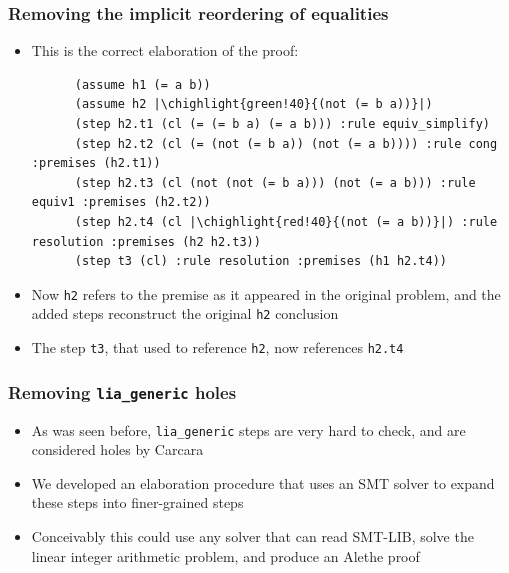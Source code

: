 \documentclass[usepdftitle=false,aspectratio=169]{beamer}
\newcommand\vitem{\vfill\item}
\newcommand\chighlight[2]{\setlength{\fboxsep}{0pt}\colorbox{#1}{#2\strut}}
\begin{document}
\begin{frame}[fragile]
  \frametitle{Removing the implicit reordering of equalities}
  \begin{itemize}
    \begin{verbatim}
      (assume h1 (= a b))
      (assume h2 |\chighlight{red!40}{(not (= a b))}|)
      (step t3 (cl) :rule resolution :premises (h1 h2))
    \end{verbatim}
    \vitem This is the correct elaboration of the proof:
    \begin{verbatim}
      (assume h1 (= a b))
      (assume h2 |\chighlight{green!40}{(not (= b a))}|)
      (step h2.t1 (cl (= (= b a) (= a b))) :rule equiv_simplify)
      (step h2.t2 (cl (= (not (= b a)) (not (= a b)))) :rule cong :premises (h2.t1))
      (step h2.t3 (cl (not (not (= b a))) (not (= a b))) :rule equiv1 :premises (h2.t2))
      (step h2.t4 (cl |\chighlight{red!40}{(not (= a b))}|) :rule resolution :premises (h2 h2.t3))
      (step t3 (cl) :rule resolution :premises (h1 h2.t4))
    \end{verbatim}
    \vitem Now \texttt{h2} refers to the premise as it appeared in the original
    problem, and the added steps reconstruct the original \texttt{h2} conclusion
    \vitem The step \texttt{t3}, that used to reference \texttt{h2}, now
    references \texttt{h2.t4}
  \end{itemize}
\end{frame}

\begin{frame}
  \frametitle{Removing \texttt{lia\_generic} holes}
  \begin{itemize}
    \item As was seen before, \texttt{lia\_generic} steps are very hard to
    check, and are considered holes by Carcara
    \vitem We developed an elaboration procedure that uses an SMT solver to
    expand these steps into finer-grained steps
    \vitem Conceivably this could use any solver that can read SMT-LIB, solve
    the linear integer arithmetic problem, and produce an Alethe proof
  \end{itemize}
\end{frame}
\end{document}

